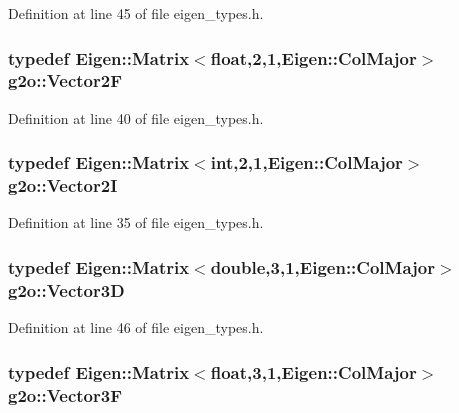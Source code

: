 Definition at line 45 of file eigen\+\_\+types.\+h.

\subsubsection[{\texorpdfstring{Vector2F}{Vector2F}}]{\setlength{\rightskip}{0pt plus 5cm}typedef Eigen\+::\+Matrix$<$float,2,1,Eigen\+::\+Col\+Major$>$ {\bf g2o\+::\+Vector2F}}\hypertarget{namespaceg2o_ab48f53e68ad9d381fcad63c4901af2e2}{}\label{namespaceg2o_ab48f53e68ad9d381fcad63c4901af2e2}


Definition at line 40 of file eigen\+\_\+types.\+h.

\subsubsection[{\texorpdfstring{Vector2I}{Vector2I}}]{\setlength{\rightskip}{0pt plus 5cm}typedef Eigen\+::\+Matrix$<$int,2,1,Eigen\+::\+Col\+Major$>$ {\bf g2o\+::\+Vector2I}}\hypertarget{namespaceg2o_affca5cbeca977d670b96298de84c5d2c}{}\label{namespaceg2o_affca5cbeca977d670b96298de84c5d2c}


Definition at line 35 of file eigen\+\_\+types.\+h.

\subsubsection[{\texorpdfstring{Vector3D}{Vector3D}}]{\setlength{\rightskip}{0pt plus 5cm}typedef Eigen\+::\+Matrix$<$double,3,1,Eigen\+::\+Col\+Major$>$ {\bf g2o\+::\+Vector3D}}\hypertarget{namespaceg2o_a944c2b1b0f84d33a7b297a4a585bf319}{}\label{namespaceg2o_a944c2b1b0f84d33a7b297a4a585bf319}


Definition at line 46 of file eigen\+\_\+types.\+h.

\subsubsection[{\texorpdfstring{Vector3F}{Vector3F}}]{\setlength{\rightskip}{0pt plus 5cm}typedef Eigen\+::\+Matrix$<$float,3,1,Eigen\+::\+Col\+Major$>$ {\bf g2o\+::\+Vector3F}}\hypertarget{namespaceg2o_a0c03efd6b49abac71bfb012cc3237288}{}\label{namespaceg2o_a0c03efd6b49abac71bfb012cc3237288}


